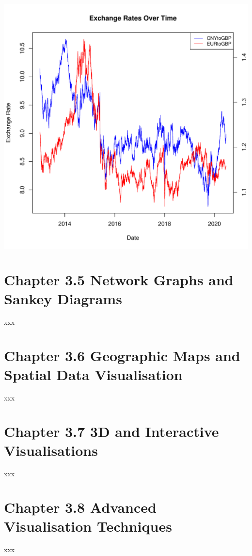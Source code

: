 \documentclass{article}\usepackage[]{graphicx}\usepackage[]{xcolor}
\makeatletter
\def\maxwidth{ %
  \ifdim\Gin@nat@width>\linewidth
    \linewidth
  \else
    \Gin@nat@width
  \fi
}
\newenvironment{knitrout}{}{} %
\makeatother
\begin{document}
\begin{knitrout}
\color{fgcolor}
\includegraphics[width=\maxwidth]{figure/unnamed-chunk-3-1} 
\end{knitrout}


\section{Chapter 3.5 Network Graphs and Sankey Diagrams}
xxx

\section{Chapter 3.6 Geographic Maps and Spatial Data Visualisation}
xxx

\section{Chapter 3.7 3D and Interactive Visualisations}
xxx

\section{Chapter 3.8 Advanced Visualisation Techniques}
xxx
\end{document}
